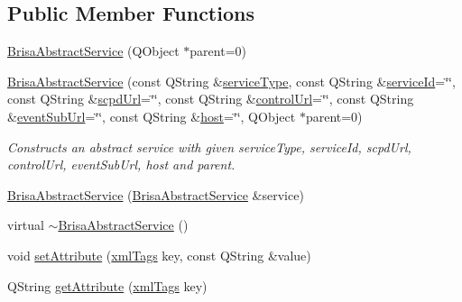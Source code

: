 \subsection*{Public Member Functions}
\begin{DoxyCompactItemize}
\item 
\hyperlink{classBrisaUpnp_1_1BrisaAbstractService_a490898486e9a4c5df805c9af816a175b}{BrisaAbstractService} (QObject $\ast$parent=0)
\item 
\hyperlink{classBrisaUpnp_1_1BrisaAbstractService_a1f94514c2e0215ef56c06eca6ae791d7}{BrisaAbstractService} (const QString \&\hyperlink{classBrisaUpnp_1_1BrisaAbstractService_a670933cc6c8581e2f70f52a97d425e4c}{serviceType}, const QString \&\hyperlink{classBrisaUpnp_1_1BrisaAbstractService_ad72b169651a6c617d27d51e7f706410d}{serviceId}=\char`\"{}\char`\"{}, const QString \&\hyperlink{classBrisaUpnp_1_1BrisaAbstractService_aa254b466f38b49b921ed7a25aea7cc8c}{scpdUrl}=\char`\"{}\char`\"{}, const QString \&\hyperlink{classBrisaUpnp_1_1BrisaAbstractService_acc5a45e07d8da5d8e086b02f4a22cc78}{controlUrl}=\char`\"{}\char`\"{}, const QString \&\hyperlink{classBrisaUpnp_1_1BrisaAbstractService_a81d2525c94d2b9572c962089c388f8f9}{eventSubUrl}=\char`\"{}\char`\"{}, const QString \&\hyperlink{classBrisaUpnp_1_1BrisaAbstractService_a9033d7f9255f3a1b6d3540258bf2ade1}{host}=\char`\"{}\char`\"{}, QObject $\ast$parent=0)
\begin{DoxyCompactList}\small\item\em Constructs an abstract service with given {\itshape serviceType\/}, {\itshape serviceId\/}, {\itshape scpdUrl\/}, {\itshape controlUrl\/}, {\itshape eventSubUrl\/}, {\itshape host\/} and {\itshape parent\/}. \item\end{DoxyCompactList}\item 
\hyperlink{classBrisaUpnp_1_1BrisaAbstractService_a847e71975f507b24db48ba5520c1ebf1}{BrisaAbstractService} (\hyperlink{classBrisaUpnp_1_1BrisaAbstractService}{BrisaAbstractService} \&service)
\item 
virtual \hyperlink{classBrisaUpnp_1_1BrisaAbstractService_a19434b738a7074b9a0f8b5677011fa9e}{$\sim$BrisaAbstractService} ()
\item 
void \hyperlink{classBrisaUpnp_1_1BrisaAbstractService_a6a55bbf6efef5e3588b6dbd43a9feafd}{setAttribute} (\hyperlink{classBrisaUpnp_1_1BrisaAbstractService_a411d13859b50b5bdb1f81e61861dbe43}{xmlTags} key, const QString \&value)
\item 
QString \hyperlink{classBrisaUpnp_1_1BrisaAbstractService_a6e14662c2e901ce3bfd9ccd0646a3b06}{getAttribute} (\hyperlink{classBrisaUpnp_1_1BrisaAbstractService_a411d13859b50b5bdb1f81e61861dbe43}{xmlTags} key)

\end{DoxyCompactItemize}
